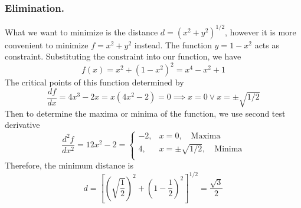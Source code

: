 \documentclass[../main.tex]{subfiles}
\begin{document}
\subsubsection*{Elimination.} What we want to minimize is the distance $d=({x^2+y^2})^{1/2}$, however it is more convenient to minimize $f=x^2+y^2$ instead. The function $y=1-x^2$ acts as constraint. Substituting the constraint into our function, we have 
\begin{equation*}
    f(x)=x^2+(1-x^2)^2=x^4-x^2+1
\end{equation*}
The critical points of this function determined by 
\begin{equation*}
    \frac{df}{dx}=4x^3-2x=x(4x^2-2)=0\implies x=0\lor x=\pm\sqrt{1/2}
\end{equation*}
Then to determine the maxima or minima of the function, we use second test derivative 
\begin{equation*}
    \frac{d^2f}{dx^2}=12x^2-2=\begin{cases}
        -2, &x=0, \quad\text{Maxima}\\
        4, &x=\pm \sqrt{1/2},\quad \text{Minima}\\
    \end{cases}
\end{equation*}
Therefore, the minimum distance is 
\begin{equation*}
    d=\left[\left(\sqrt{\frac{1}{2}}\right)^2+\left(1-\frac{1}{2}\right)^2\right]^{1/2}=\frac{\sqrt{3}}{2}
\end{equation*}
\end{document}
